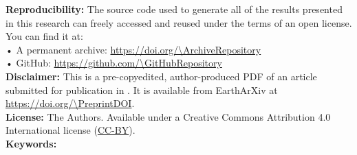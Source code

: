 \documentclass[onecolumn,11pt]{article}
\begin{document}
\maketitle

\begin{abstract}
    
\end{abstract}

\begin{summarybox}
  \noindent
  \textbf{Reproducibility:}
  The source code used to generate all of the results presented in this
  research can freely accessed and reused under the terms of an open license.
  You can find it at:
  \\
  • \faBoxOpen{} A permanent archive: \url{https://doi.org/\ArchiveRepository}
  \\
  • \faGithub{} GitHub: \url{https://github.com/\GitHubRepository}
  \\[0.25cm]
  \noindent
  \textbf{Disclaimer:}
  This is a pre-copyedited, author-produced PDF of an article
  submitted for publication in \textit{\Journal{}}.
  It is available from EarthArXiv at
  \url{https://doi.org/\PreprintDOI}.
  \\[0.25cm]
  \noindent
  \textbf{License:}
  \textcopyright{} \Year{} The Authors.
  Available under a Creative Commons Attribution 4.0 International license
  (\href{https://creativecommons.org/licenses/by/4.0/}{CC-BY}).
  \\[0.25cm]
  \noindent
  \textbf{Keywords:} \Keywords{}
\end{summarybox}





\end{document}

